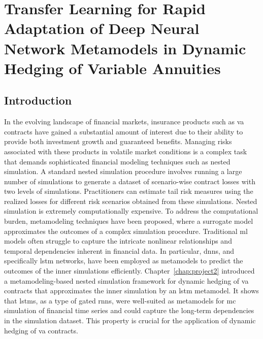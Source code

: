 \chapter{Transfer Learning for Rapid Adaptation of Deep Neural Network Metamodels in Dynamic Hedging of Variable Annuities} \label{chap:project3}

\section{Introduction}

In the evolving landscape of financial markets, insurance products such as \gls{va} contracts have gained a substantial amount of interest due to their ability to provide both investment growth and guaranteed benefits. 
Managing risks associated with these products in volatile market conditions is a complex task that demands sophisticated financial modeling techniques such as nested simulation.
A standard nested simulation procedure involves running a large number of simulations to generate a dataset of scenario-wise contract losses with two levels of simulations.
Practitioners can estimate tail risk measures using the realized losses for different risk scenarios obtained from these simulations.
Nested simulation is extremely computationally expensive.
To address the computational burden, metamodeling techniques have been proposed, where a surrogate model approximates the outcomes of a complex simulation procedure. 
Traditional \gls{ml} models often struggle to capture the intricate nonlinear relationships and temporal dependencies inherent in financial data.
In particular, \gls{dnn}s, and specifically \gls{lstm} networks, have been employed as metamodels to predict the outcomes of the inner simulations efficiently.
Chapter~\ref{chap:project2} introduced a metamodeling-based nested simulation framework for dynamic hedging of \gls{va} contracts that approximates the inner simulation by an \gls{lstm} metamodel.
It shows that \gls{lstm}s, as a type of gated \gls{rnn}s, were well-suited as metamodels for \gls{mc} simulation of financial time series and could capture the long-term dependencies in the simulation dataset.
This property is crucial for the application of dynamic hedging of \gls{va} contracts.

